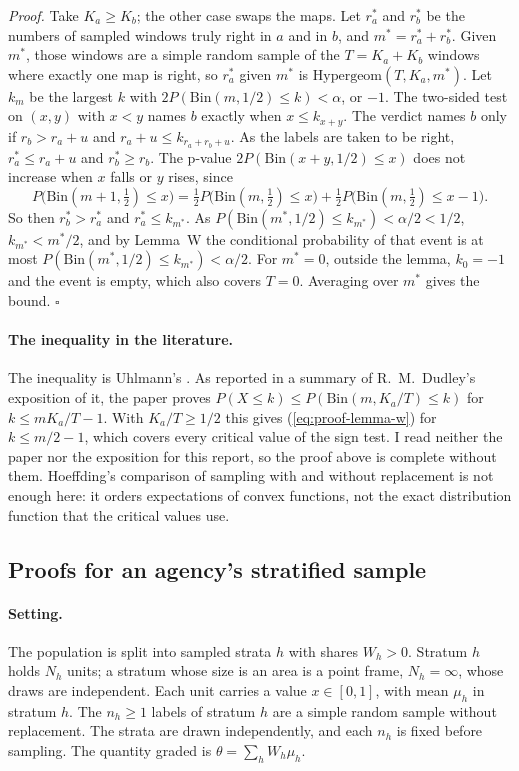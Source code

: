 \documentclass[11pt,a4paper]{article}
\begin{document}
\textit{Proof.} Take $K_a \ge K_b$; the other case swaps the maps. Let $r_a^*$ and $r_b^*$ be the numbers of sampled
windows truly right in $a$ and in $b$, and $m^* = r_a^* + r_b^*$. Given $m^*$, those windows are a simple random
sample of the $T = K_a + K_b$ windows where exactly one map is right, so $r_a^*$ given $m^*$ is
$\mathrm{Hypergeom}(T, K_a, m^*)$. Let $k_m$ be the largest $k$ with $2P(\mathrm{Bin}(m, 1/2) \le k) < \alpha$, or
$-1$. The two-sided test on $(x, y)$ with $x < y$ names $b$ exactly when $x \le k_{x+y}$. The verdict names $b$ only
if $r_b > r_a + u$ and $r_a + u \le k_{r_a+r_b+u}$. As the labels are taken to be right, $r_a^* \le r_a + u$ and
$r_b^* \ge r_b$. The p-value $2P(\mathrm{Bin}(x + y, 1/2) \le x)$ does not increase when $x$ falls or $y$ rises,
since
\[
  P\bigl(\mathrm{Bin}(m+1, \tfrac12) \le x\bigr)
  = \tfrac{1}{2} P\bigl(\mathrm{Bin}(m, \tfrac12) \le x\bigr)
  + \tfrac{1}{2} P\bigl(\mathrm{Bin}(m, \tfrac12) \le x - 1\bigr).
\]
So then $r_b^* > r_a^*$ and $r_a^* \le k_{m^*}$. As $P(\mathrm{Bin}(m^*, 1/2) \le k_{m^*}) < \alpha/2 < 1/2$,
$k_{m^*} < m^*/2$, and by Lemma~W the conditional probability of that event is at most
$P(\mathrm{Bin}(m^*, 1/2) \le k_{m^*}) < \alpha/2$. For $m^* = 0$, outside the lemma, $k_0 = -1$ and the event is
empty, which also covers $T = 0$. Averaging over $m^*$ gives the bound. $\square$

\paragraph{The inequality in the literature.} The inequality is Uhlmann's \citep{uhlmann1966}. As reported in a
summary of R.~M.~Dudley's exposition of it, the paper proves $P(X \le k) \le P(\mathrm{Bin}(m, K_a/T) \le k)$ for
$k \le m K_a/T - 1$. With $K_a/T \ge 1/2$ this gives (\ref{eq:proof-lemma-w}) for $k \le m/2 - 1$, which covers every
critical value of the sign test. I read neither the paper nor the exposition for this report, so the proof above is
complete without them. Hoeffding's comparison of sampling with and without replacement \citep{hoeffding1963} is not
enough here: it orders expectations of convex functions, not the exact distribution function that the critical
values use.

\subsection{Proofs for an agency's stratified sample}
\label{sec:proofs-agency}

\paragraph{Setting.} The population is split into sampled strata $h$ with shares $W_h > 0$. Stratum $h$ holds $N_h$
units; a stratum whose size is an area is a point frame, $N_h = \infty$, whose draws are independent. Each unit
carries a value $x \in [0, 1]$, with mean $\mu_h$ in stratum $h$. The $n_h \ge 1$ labels of stratum $h$ are a simple
random sample without replacement. The strata are drawn independently, and each $n_h$ is fixed before sampling. The
quantity graded is $\theta = \sum_h W_h \mu_h$.
\end{document}
